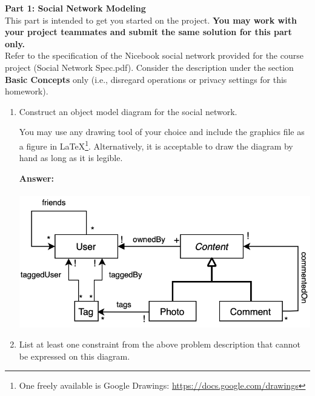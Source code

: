 \noindent \textbf{Part 1: Social Network Modeling} \\

\noindent This part is intended to get you started on the
project. \textbf{You may work with your project teammates and submit
	the same solution for this part only.} \\

\noindent Refer to the specification of the \textsf{Nicebook} social
network provided for the course project (\textsf{Social Network
	Spec.pdf}). Consider the description under the section \textbf{Basic
	Concepts} only (i.e., disregard operations or privacy settings for
this homework). 

\begin{enumerate}
	\item Construct an object model diagram for the social network.
	      
	      You may use any drawing tool of your choice and include the graphics
	      file as a figure in LaTeX\footnote{One freely available is Google
		      Drawings: \url{https://docs.google.com/drawings}}. Alternatively, it is acceptable to draw
	      the diagram by hand as long as it is legible.

        \textbf {Answer:}\\\\
        \includegraphics[width=5in]{hw6model.png}

	\item List at least one constraint from the above problem description that cannot be
	      expressed on this diagram.


\end{enumerate}
